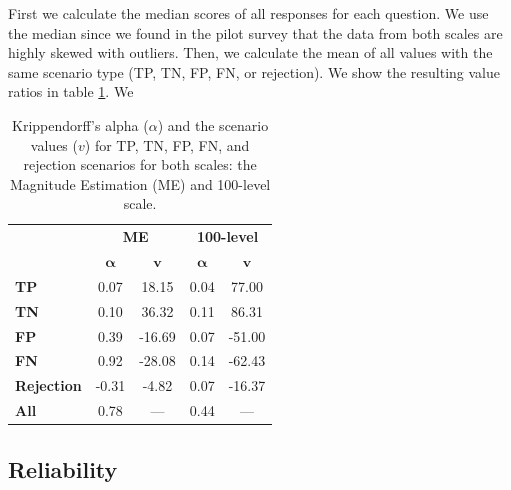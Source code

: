 %
First we calculate the median scores of all responses for each question.
%
We use the median since we found in the pilot survey that the data from both scales are highly skewed with outliers.
%
Then, we calculate the mean of all values with the same scenario type (TP, TN, FP, FN, or rejection).
%
We show the resulting value ratios in table \ref{tab:values-reliability}.
%
We

\begin{table}[t]
    \centering
    \begin{tabular}{lcccc}
        \toprule
                           & \multicolumn{2}{c}{\textbf{ME}} & \multicolumn{2}{c}{\textbf{100-level}}                                        \\
        \cmidrule(l){2-3} \cmidrule(l){4-5}
                           & $\boldsymbol{\alpha}$           & $\textbf{v}$                           & $\boldsymbol{\alpha}$ & $\textbf{v}$ \\
        \midrule
        \textbf{TP}        & 0.07                            & 18.15                                  & 0.04                  & 77.00        \\
        \textbf{TN}        & 0.10                            & 36.32                                  & 0.11                  & 86.31        \\
        \textbf{FP}        & 0.39                            & -16.69                                 & 0.07                  & -51.00       \\
        \textbf{FN}        & 0.92                            & -28.08                                 & 0.14                  & -62.43       \\
        \textbf{Rejection} & -0.31                           & -4.82                                  & 0.07                  & -16.37       \\
        \midrule
        \textbf{All}       & 0.78                            & ---                                    & 0.44                  & ---          \\
        \bottomrule
    \end{tabular}
    \caption{Krippendorff's alpha ($\alpha$) and the scenario values ($v$) for TP, TN, FP, FN, and rejection scenarios for both scales: the Magnitude Estimation (ME) and 100-level scale.}
    \label{tab:values-reliability}
\end{table}

\subsection{Reliability}
\label{sec:results-reliability}

